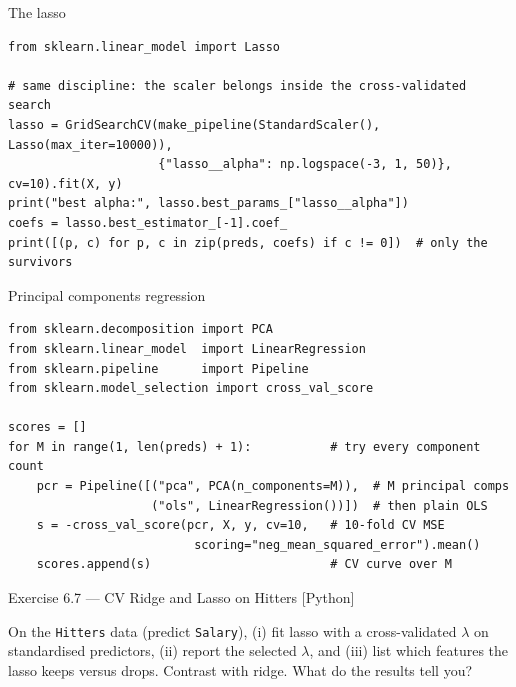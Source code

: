 \documentclass[aspectratio=169,11pt]{beamer}
\begin{document}
\begin{frame}[fragile]{The lasso}
  \begin{lstlisting}
from sklearn.linear_model import Lasso

# same discipline: the scaler belongs inside the cross-validated search
lasso = GridSearchCV(make_pipeline(StandardScaler(), Lasso(max_iter=10000)),
                     {"lasso__alpha": np.logspace(-3, 1, 50)}, cv=10).fit(X, y)
print("best alpha:", lasso.best_params_["lasso__alpha"])
coefs = lasso.best_estimator_[-1].coef_
print([(p, c) for p, c in zip(preds, coefs) if c != 0])  # only the survivors
  \end{lstlisting}
\end{frame}

\begin{frame}[fragile]{Principal components regression}
  \begin{lstlisting}
from sklearn.decomposition import PCA
from sklearn.linear_model  import LinearRegression
from sklearn.pipeline      import Pipeline
from sklearn.model_selection import cross_val_score

scores = []
for M in range(1, len(preds) + 1):           # try every component count
    pcr = Pipeline([("pca", PCA(n_components=M)),  # M principal comps
                    ("ols", LinearRegression())])  # then plain OLS
    s = -cross_val_score(pcr, X, y, cv=10,   # 10-fold CV MSE
                          scoring="neg_mean_squared_error").mean()
    scores.append(s)                         # CV curve over M
  \end{lstlisting}
\end{frame}

\begin{frame}[fragile]{Exercise 6.7 --- CV Ridge and Lasso on Hitters [Python]}
  \begin{exercise}
    On the \texttt{Hitters} data (predict \texttt{Salary}), (i) fit
    lasso with a cross-validated $\lambda$ on standardised predictors,
    (ii) report the selected $\lambda$, and (iii) list which features the
    lasso keeps versus drops. Contrast with ridge. What do the results
    tell you?
  \end{exercise}
\end{frame}
\end{document}
